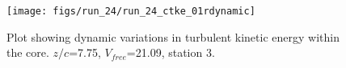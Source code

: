 \begin{figure}[H]
\centering
\texttt{[image: figs/run\_24/run\_24\_ctke\_01rdynamic]}
\caption{Plot showing dynamic variations in turbulent kinetic energy within the core. $z/c$=7.75, $V_{free}$=21.09, station 3.}
\label{fig:run_24_ctke_01rdynamic}
\end{figure}


